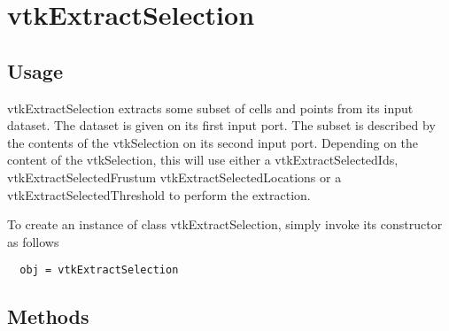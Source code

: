 \section{vtkExtractSelection}

\subsection{Usage}

 vtkExtractSelection extracts some subset of cells and points from
 its input dataset. The dataset is given on its first input port. 
 The subset is described by the contents of the vtkSelection on its 
 second input port. Depending on the content of the vtkSelection,
 this will use either a vtkExtractSelectedIds, vtkExtractSelectedFrustum
 vtkExtractSelectedLocations or a vtkExtractSelectedThreshold to perform
 the extraction.

To create an instance of class vtkExtractSelection, simply
invoke its constructor as follows
\begin{verbatim}
  obj = vtkExtractSelection
\end{verbatim}
\subsection{Methods}


